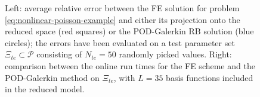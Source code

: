 \documentclass[12pt, a4paper, twoside, openright, notitlepage]{report}
\numberwithin{equation}{chapter}
\theoremstyle{theorem}
\theoremstyle{definition}
\theoremstyle{remark}
\theoremstyle{proposition}
\numberwithin{figure}{chapter}
\begin{document}
\begin{figure}[H]
						
			\caption{Left: average relative error between the FE solution for problem \eqref{eq:nonlinear-poisson-example} and either its projection onto the reduced space (red squares) or the POD-Galerkin RB solution (blue circles); the errors have been evaluated on a test parameter set $\Xi_{te} \subset \mathcal{P}$ consisting of $N_{te} = 50$ randomly picked values. Right: comparison between the online run times for the FE scheme and the POD-Galerkin method on $\Xi_{te}$, with $L = 35$ basis functions included in the reduced model.}
			\label{fig:nonlinear-poisson-example}
		\end{figure}
		
\end{document}
